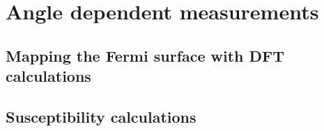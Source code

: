 
\section{Angle dependent measurements}

\subsection{Mapping the Fermi surface with DFT calculations}

\subsection{Susceptibility calculations}

